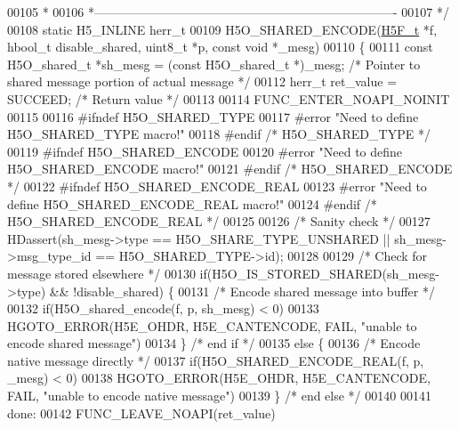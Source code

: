 \begin{DoxyCode}
00105 \textcolor{comment}{ *}
00106 \textcolor{comment}{ *-------------------------------------------------------------------------}
00107 \textcolor{comment}{ */}
00108 \textcolor{keyword}{static} H5\_INLINE herr\_t
00109 H5O\_SHARED\_ENCODE(\hyperlink{struct_h5_f__t}{H5F\_t} *f, hbool\_t disable\_shared, uint8\_t *p, \textcolor{keyword}{const} \textcolor{keywordtype}{void} *\_mesg)
00110 \{
00111     \textcolor{keyword}{const} H5O\_shared\_t *sh\_mesg = (\textcolor{keyword}{const} H5O\_shared\_t *)\_mesg;     \textcolor{comment}{/* Pointer to shared message portion of
       actual message */}
00112     herr\_t ret\_value = SUCCEED;         \textcolor{comment}{/* Return value */}
00113 
00114     FUNC\_ENTER\_NOAPI\_NOINIT
00115 
00116 \textcolor{preprocessor}{#ifndef H5O\_SHARED\_TYPE}
00117 \textcolor{preprocessor}{#error "Need to define H5O\_SHARED\_TYPE macro!"}
00118 \textcolor{preprocessor}{#endif }\textcolor{comment}{/* H5O\_SHARED\_TYPE */}\textcolor{preprocessor}{}
00119 \textcolor{preprocessor}{#ifndef H5O\_SHARED\_ENCODE}
00120 \textcolor{preprocessor}{#error "Need to define H5O\_SHARED\_ENCODE macro!"}
00121 \textcolor{preprocessor}{#endif }\textcolor{comment}{/* H5O\_SHARED\_ENCODE */}\textcolor{preprocessor}{}
00122 \textcolor{preprocessor}{#ifndef H5O\_SHARED\_ENCODE\_REAL}
00123 \textcolor{preprocessor}{#error "Need to define H5O\_SHARED\_ENCODE\_REAL macro!"}
00124 \textcolor{preprocessor}{#endif }\textcolor{comment}{/* H5O\_SHARED\_ENCODE\_REAL */}\textcolor{preprocessor}{}
00125 
00126     \textcolor{comment}{/* Sanity check */}
00127     HDassert(sh\_mesg->type == H5O\_SHARE\_TYPE\_UNSHARED || sh\_mesg->msg\_type\_id == H5O\_SHARED\_TYPE->id);
00128 
00129     \textcolor{comment}{/* Check for message stored elsewhere */}
00130     \textcolor{keywordflow}{if}(H5O\_IS\_STORED\_SHARED(sh\_mesg->type) && !disable\_shared) \{
00131         \textcolor{comment}{/* Encode shared message into buffer */}
00132         \textcolor{keywordflow}{if}(H5O\_shared\_encode(f, p, sh\_mesg) < 0)
00133         HGOTO\_ERROR(H5E\_OHDR, H5E\_CANTENCODE, FAIL, \textcolor{stringliteral}{"unable to encode shared message"})
00134     \} \textcolor{comment}{/* end if */}
00135     \textcolor{keywordflow}{else} \{
00136         \textcolor{comment}{/* Encode native message directly */}
00137         \textcolor{keywordflow}{if}(H5O\_SHARED\_ENCODE\_REAL(f, p, \_mesg) < 0)
00138         HGOTO\_ERROR(H5E\_OHDR, H5E\_CANTENCODE, FAIL, \textcolor{stringliteral}{"unable to encode native message"})
00139     \} \textcolor{comment}{/* end else */}
00140 
00141 done:
00142     FUNC\_LEAVE\_NOAPI(ret\_value)

\end{DoxyCode}
